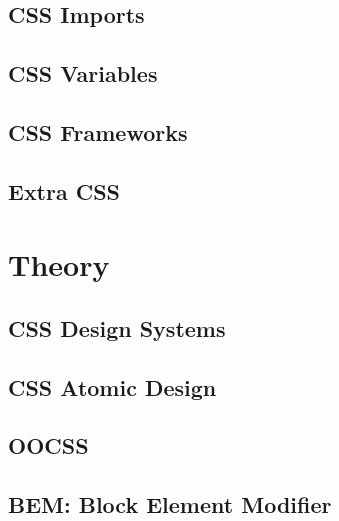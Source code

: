 \documentclass[b5paper,openany]{book}
\begin{document}
\section{CSS Imports}
%

\section{CSS Variables}
%

\section{CSS Frameworks}
%

\section{Extra CSS}
%


\chapter{Theory}

\section{CSS Design Systems}
%

\section{CSS Atomic Design}
%

\section{OOCSS}
%

\section{BEM: Block Element Modifier}
%





\end{document}
